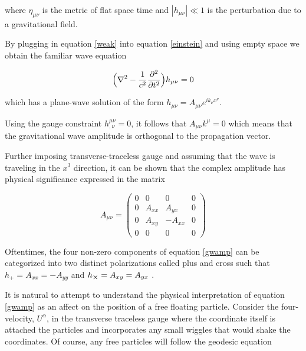 \documentclass[oneside]{book}
\begin{document}
	where $\eta_{\mu \nu}$ is the metric of flat space time and $|h_{\mu \nu}| \ll 1$ is the perturbation due to a gravitational field.
	
	By plugging in equation \ref{weak} into equation \ref{einstein} and using empty space we obtain the familiar wave equation
	
	\begin{equation} \label{wave}
	\Big(\nabla^2 - \frac{1}{c^2} \pdv[2]{t} \Big) h_{\mu \nu}  = 0
	\end{equation}

	which has a plane-wave solution of the form $h_{\mu \nu} = A_{\mu \nu} e^{ik_{\nu} x^{\nu}}$. 
	
	Using the gauge constraint $h^{\mu \nu}_{,\nu} = 0$, it follows that $A_{\mu \nu} k^{\mu} = 0$ which means that the gravitational wave amplitude is orthogonal to the propagation vector.
	
	Further imposing transverse-traceless gauge and assuming that the wave is traveling in the $x^3$ direction, it can be shown that the complex amplitude has physical significance expressed in the matrix
	
	\begin{equation} \label{gwamp}
	A_{\mu \nu} = 
	\begin{pmatrix}
			0 &    0   &  0      & 0 
		 \\ 0 & A_{xx} &  A_{yx} & 0
		 \\ 0 & A_{xy} & -A_{xx} & 0
		 \\ 0 &    0   &  0      & 0
	\end{pmatrix}
	\end{equation}

	Oftentimes, the four non-zero components of equation \ref{gwamp} can be categorized into two distinct polarizations called plus and cross such that $h_{+} = A_{xx} = -A_{yy}$ and $h_{\cross} = A_{xy} = A_{yx}$ .

 
	It is natural to attempt to understand the physical interpretation of equation \ref{gwamp} as an affect on the position of a free floating particle. Consider the four-velocity, $U^{\alpha}$, in the transverse traceless gauge where the coordinate itself is attached the particles and incorporates any small wiggles that would shake the coordinates.  Of course, any free particles will follow the geodesic equation
	
\end{document}
